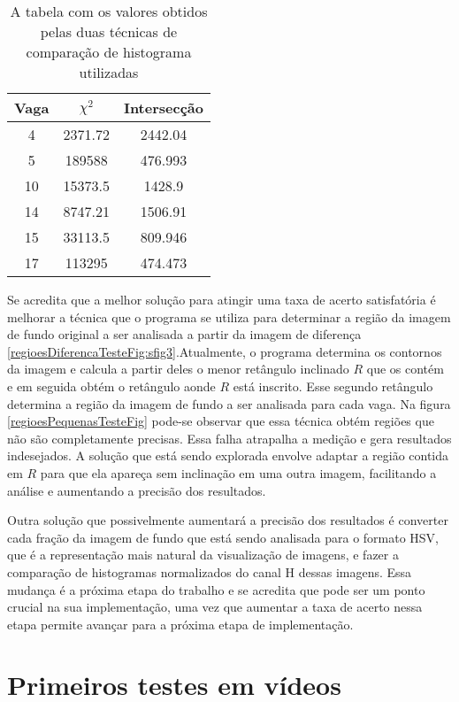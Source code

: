 \begin{table}
\centering
 \begin{tabular}{||c c c||}
 \hline
 Vaga & $\chi^2$ & Intersecção \\ [0.5ex]
 \hline\hline
 4 & 2371.72 & 2442.04 \\
 \hline
 5 & 189588 & 476.993 \\
 \hline
 10 & 15373.5 & 1428.9 \\
 \hline
 14& 8747.21 & 1506.91 \\
 \hline
 15 & 33113.5 & 809.946 \\
 \hline
 17 & 113295 & 474.473 \\ [1ex]
 \hline
\end{tabular}

\caption{A tabela com os valores obtidos pelas duas técnicas de comparação de histograma utilizadas}
\label{tabelaDiferencasHistogramas}
\end{table}




Se acredita que a melhor solução para atingir uma taxa de acerto satisfatória é melhorar a técnica que o programa se utiliza para determinar a região da imagem de fundo original a ser analisada a partir da imagem de diferença \ref{regioesDiferencaTesteFig:sfig3}.Atualmente, o programa determina os contornos da imagem e calcula a partir deles o menor retângulo inclinado $R$ que os contém e em seguida obtém o retângulo aonde $R$ está inscrito. Esse segundo retângulo determina a região da imagem de fundo a ser analisada para cada vaga. Na figura \ref{regioesPequenasTesteFig} pode-se observar que essa técnica obtém regiões que não são completamente precisas. Essa falha atrapalha a medição e gera resultados indesejados. A solução que está sendo explorada envolve adaptar a região contida em $R$ para que ela apareça sem inclinação em uma outra imagem, facilitando a análise e aumentando a precisão dos resultados.

Outra solução que possivelmente aumentará a precisão dos resultados é converter cada fração da imagem de fundo que está sendo analisada para o formato HSV, que é a representação mais natural da visualização de imagens, e fazer a comparação de histogramas normalizados do canal H dessas imagens. Essa mudança é a próxima etapa do trabalho e se acredita que pode ser um ponto crucial na sua implementação, uma vez que aumentar a taxa de acerto nessa etapa permite avançar para a próxima etapa de implementação.

\section{Primeiros testes em vídeos}\label{testesVideos}

